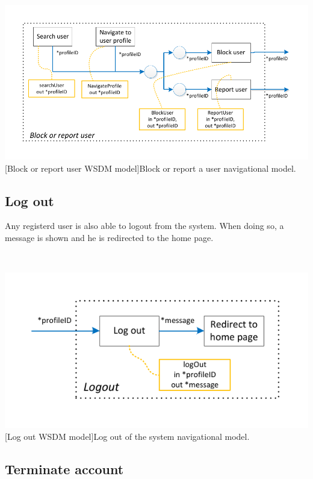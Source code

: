 \documentclass[11pt, a4paper,svglistings,oneside]{book}
\begin{document}
$\;$ \\
\noindent\begin{minipage}{\textwidth}
    \centering
   \includegraphics[scale=1.05]{nav_BlockReport.pdf}
 [Block or report user WSDM model]{Block or report a user navigational model.}
\end{minipage}

\subsection{Log out}

Any registerd user is also able to logout from the system. When doing so, a message is shown and he is redirected to the home page.

$\;$ \\
\noindent\begin{minipage}{\textwidth}
    \centering
   \includegraphics[scale=1.4]{nav_LogOff.pdf}
 [Log out WSDM model]{Log out of the system navigational model.}
\end{minipage}

\clearpage

\subsection{Terminate account}
\end{document}

